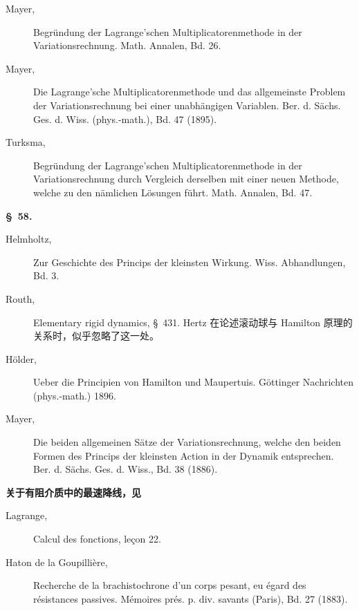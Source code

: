\documentclass[11pt,a4paper,leqno]{article}
\begin{document}
\begin{description}
\item[Mayer,]\hspace{0pt} Begründung der Lagrange'schen Multiplicatoren\-methode in der
Variations\-rechnung. Math. Annalen, Bd. 26.

\item[Mayer,] Die Lagrange'sche Multiplicatoren\-methode und das allgemeinste
Problem der Variations\-rechnung bei einer unabhängigen Variablen. Ber. d.
Sächs. Ges. d. Wiss. (phys.-math.), Bd. 47 (1895).

\item[Turksma,] Begründung der Lagrange'schen Multiplicatoren\-methode in der
Variations\-rechnung durch Vergleich derselben mit einer neuen Methode, welche
zu den nämlichen Lösungen führt. Math. Annalen, Bd. 47.
\end{description}

\begin{center}{\bfseries \S~58.}\end{center}

\begin{description}
\item[Helmholtz,] Zur Geschichte des Princips der kleinsten Wirkung. Wiss.
Abhandlungen, Bd. 3.

\item[Routh,] Elementary rigid dynamics, \S~431. Hertz 在论述滚动球与 Hamilton
原理的关系时，似乎忽略了这一处。

\item[Hölder,] Ueber die Principien von Hamilton und Maupertuis. Göttinger
Nachrichten (phys.-math.) 1896.

\item[Mayer,] Die beiden allgemeinen Sätze der Variationsrechnung, welche den
beiden Formen des Princips der kleinsten Action in der Dynamik entsprechen.
Ber. d. Sächs. Ges. d. Wiss., Bd. 38 (1886).
\end{description}

\begin{center}{\bfseries 关于有阻介质中的最速降线，见}\end{center}

\begin{description}
\item[Lagrange,] Calcul des fonctions, leçon 22.

\item[Haton de la Goupillière,] Recherche de la brachistochrone d'un corps
pesant, eu égard des résistances passives. Mémoires prés. p. div. savants
(Paris), Bd. 27 (1883).
\end{description}
\end{document}
